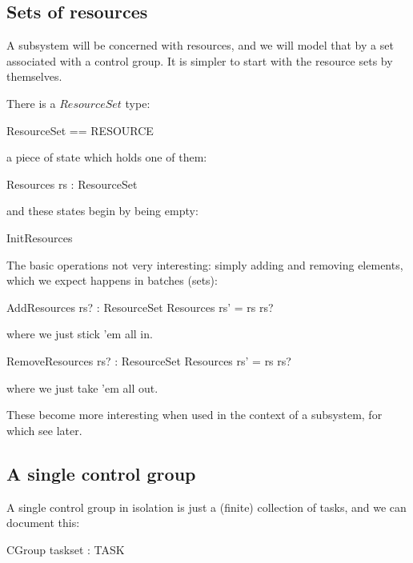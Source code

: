 \documentclass[a4paper,twoside,12pt]{article}
\begin{document}
\subsection{Sets of resources}

A subsystem will be concerned with resources, and we will model that by a set associated
with a control group. It is simpler to start with the resource sets by themselves.

There is a $ResourceSet$ type:
\begin{zed}
ResourceSet == \finset RESOURCE
\end{zed}
a piece of state which holds one of them:
\begin{schema}{Resources}
rs : ResourceSet
\end{schema}
and these states begin by being empty:
\begin{zed}
InitResources 
\end{zed}

The basic operations not very interesting: simply adding and removing elements, which we expect happens
in batches (sets):

\begin{schema}{AddResources}
rs? : ResourceSet
\also
\Delta Resources
\where
rs' = rs \cup rs?
\end{schema}
where we just stick 'em all in.

\begin{schema}{RemoveResources}
rs? : ResourceSet
\also
\Delta Resources
\where
rs' = rs \setminus rs?
\end{schema}
where we just take 'em all out.

These become more interesting when used in the context of a subsystem, for which see later.

\subsection{A single control group}

A single control group in isolation is just a (finite) collection of tasks, and we can document this:

\begin{schema}{CGroup}
taskset : \finset TASK
\end{schema}
\end{document}
